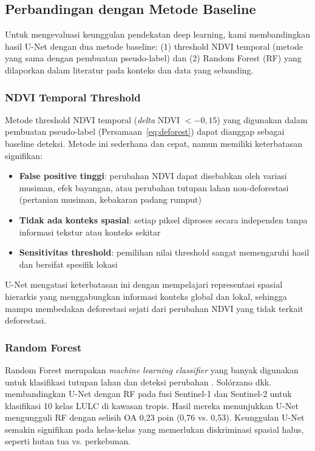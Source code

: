 \documentclass[12pt,a4paper]{article}
\begin{document}
\subsection{Perbandingan dengan Metode Baseline}
\label{subsec:baseline}

Untuk mengevaluasi keunggulan pendekatan deep learning, kami
membandingkan hasil U-Net dengan dua metode baseline: (1) threshold
NDVI temporal (metode yang sama dengan pembuatan pseudo-label) dan
(2) Random Forest (RF) yang dilaporkan dalam literatur pada konteks
dan data yang sebanding.

\subsubsection{NDVI Temporal Threshold}
\label{subsubsec:ndvi_baseline}

Metode threshold NDVI temporal (\textit{delta} NDVI $< -0,15$)
yang digunakan dalam pembuatan pseudo-label (Persamaan~\ref{eq:deforest})
dapat dianggap sebagai baseline deteksi. Metode ini sederhana dan
cepat, namun memiliki keterbatasan signifikan:

\begin{itemize}[nosep]
    \item \textbf{False positive tinggi}: perubahan NDVI dapat
          disebabkan oleh variasi musiman, efek bayangan, atau
          perubahan tutupan lahan non-deforestasi (pertanian
          musiman, kebakaran padang rumput)
    \item \textbf{Tidak ada konteks spasial}: setiap piksel diproses
          secara independen tanpa informasi tekstur atau konteks
          sekitar
    \item \textbf{Sensitivitas threshold}: pemilihan nilai threshold
          sangat memengaruhi hasil dan bersifat spesifik lokasi
\end{itemize}

U-Net mengatasi keterbatasan ini dengan mempelajari representasi
spasial hierarkis yang menggabungkan informasi konteks global dan
lokal, sehingga mampu membedakan deforestasi sejati dari perubahan
NDVI yang tidak terkait deforestasi.

\subsubsection{Random Forest}
\label{subsubsec:rf_baseline}

Random Forest merupakan \textit{machine learning classifier} yang
banyak digunakan untuk klasifikasi tutupan lahan dan deteksi
perubahan \cite{solorzano2021lulc}. Solórzano dkk.
\cite{solorzano2021lulc} membandingkan U-Net dengan RF pada fusi
Sentinel-1 dan Sentinel-2 untuk klasifikasi 10 kelas LULC di
kawasan tropis. Hasil mereka menunjukkan U-Net mengungguli RF
dengan selisih OA 0,23 poin (0,76 vs. 0,53). Keunggulan U-Net
semakin signifikan pada kelas-kelas yang memerlukan diskriminasi
spasial halus, seperti hutan tua vs. perkebunan.
\end{document}
